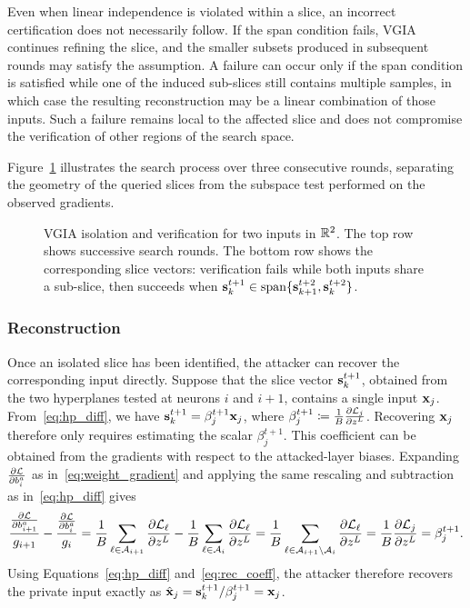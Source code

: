 Even when linear independence is violated within a slice, an incorrect certification does not necessarily follow. If the span condition fails, VGIA continues refining the slice, and the smaller subsets produced in subsequent rounds may satisfy the assumption. A failure can occur only if the span condition is satisfied while one of the induced sub-slices still contains multiple samples, in which case the resulting reconstruction may be a linear combination of those inputs. Such a failure remains local to the affected slice and does not compromise the verification of other regions of the search space.
 

Figure~\ref{fig:vgia_isolation_sequence} illustrates the search process over three
consecutive rounds, separating the geometry of the queried slices from the
subspace test performed on the observed gradients.
\begin{figure}[!htbp]
    \centering
    \resizebox{\linewidth}{!}{}
    \caption[Step-by-step isolation and verification in VGIA]{VGIA isolation and verification for two inputs in $\mathbb{R}^2$. The top row shows successive search rounds. The bottom row shows the corresponding slice vectors: verification fails while both inputs share a sub-slice, then succeeds when $\mathbf{s}_k^{t+1}\in\operatorname{span}\{\mathbf{s}_{k+1}^{t+2},\mathbf{s}_k^{t+2}\}$.}
    \label{fig:vgia_isolation_sequence}
\end{figure}

\subsubsection{Reconstruction}
Once an isolated slice has been identified, the attacker can recover the corresponding input directly. Suppose that the slice vector $\mathbf{s}_k^{t+1}$, obtained from the two hyperplanes tested at neurons $i$ and $i+1$, contains a single input ${\mathbf{x}}_j$. From~\eqref{eq:hp_diff}, we have
$\mathbf{s}_k^{t+1} = \beta_j^{t+1}{\mathbf{x}}_j$, where
$\beta_j^{t+1} \coloneqq \frac{1}{B}\frac{\partial \mathcal{L}_j}{\partial z^{L}}$.
Recovering ${\mathbf{x}}_j$ therefore only requires estimating the scalar $\beta_j^{t+1}$.
This coefficient can be obtained from the gradients with respect to the attacked-layer biases. Expanding $\frac{\partial \mathcal{L}}{\partial b_i^a}$ as in~\eqref{eq:weight_gradient} and applying the same rescaling and subtraction as in~\eqref{eq:hp_diff} gives
\begin{equation}
\frac{\frac{\partial \mathcal{L}}{\partial b_{i+1}^a}}{g_{i+1}}
-
\frac{\frac{\partial \mathcal{L}}{\partial b_i^a}}{g_i}  =
\frac{1}{B} \sum_{\ell \in \mathcal{A}_{i+1}}
\frac{\partial \mathcal{L}_\ell}{\partial z^{L}}
-
\frac{1}{B} \sum_{\ell \in \mathcal{A}_i}
\frac{\partial \mathcal{L}_\ell}{\partial z^{L}}  =
\frac{1}{B}
\sum_{\ell \in \mathcal{A}_{i+1} \setminus \mathcal{A}_i}
\frac{\partial \mathcal{L}_\ell}{\partial z^{L}} = \frac{1}{B}\frac{\partial \mathcal{L}_j}{\partial z^{L}} = \beta_j^{t+1}.
\label{eq:rec_coeff}
\end{equation}
Using Equations~\eqref{eq:hp_diff} and~\eqref{eq:rec_coeff}, the attacker therefore recovers the private input exactly as
$\hat{{\mathbf{x}}}_j=\mathbf{s}_k^{t+1}/\beta_j^{t+1}={\mathbf{x}}_j$. 

